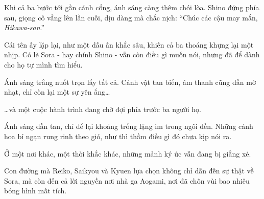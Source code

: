 \documentclass[../main.tex]{subfiles}
\begin{document}
Khi cả ba bước tới gần cánh cổng, ánh sáng càng thêm chói lòa. Shino đứng phía sau, giọng cô vẳng lên lần cuối, dịu dàng mà chắc nịch: ``Chúc các cậu may mắn, \emph{Hikawa-san}.''

Cái tên ấy lặp lại, như một dấu ấn khắc sâu, khiến cả ba thoáng khựng lại một nhịp. Có lẽ Sora - hay chính Shino - vẫn còn điều gì muốn nói, nhưng đã để dành cho họ tự mình tìm hiểu.

Ánh sáng trắng nuốt trọn lấy tất cả. Cảnh vật tan biến, âm thanh cũng dần mờ nhạt, chỉ còn lại một sự yên ắng\dots

\dots và một cuộc hành trình đang chờ đợi phía trước ba người họ.

Ánh sáng dần tan, chỉ để lại khoảng trống lặng im trong ngôi đền. Những cánh hoa bỉ ngạn rung rinh theo gió, như thì thầm điều gì đó chưa kịp nói ra.

Ở một nơi khác, một thời khắc khác, những mảnh ký ức vẫn đang bị giằng xé.

Con đường mà Reiko, Saikyou và Kyuen lựa chọn không chỉ dẫn đến sự thật về Sora, mà còn đến cả lời nguyền nơi nhà ga Aogami, nơi đã chôn vùi bao nhiêu bóng hình mất tích.
\end{document}
